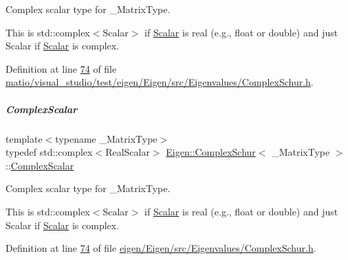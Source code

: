 Complex scalar type for {\ttfamily \+\_\+\+Matrix\+Type}. 

This is {\ttfamily std\+::complex$<$\+Scalar$>$} if \hyperlink{group___eigenvalues___module_a9a8ee9df37ee1f90d0e53103c58683c0}{Scalar} is real (e.\+g., {\ttfamily float} or {\ttfamily double}) and just {\ttfamily Scalar} if \hyperlink{group___eigenvalues___module_a9a8ee9df37ee1f90d0e53103c58683c0}{Scalar} is complex. 

Definition at line \hyperlink{matio_2visual__studio_2test_2eigen_2_eigen_2src_2_eigenvalues_2_complex_schur_8h_source_l00074}{74} of file \hyperlink{matio_2visual__studio_2test_2eigen_2_eigen_2src_2_eigenvalues_2_complex_schur_8h_source}{matio/visual\+\_\+studio/test/eigen/\+Eigen/src/\+Eigenvalues/\+Complex\+Schur.\+h}.

\mbox{\label{group___eigenvalues___module_ae1a4713b53f821867fbad617e426832a}} 
\subparagraph{\texorpdfstring{Complex\+Scalar}{ComplexScalar}\hspace{0.1cm}{\footnotesize\ttfamily [2/2]}}
{\footnotesize\ttfamily template$<$typename \+\_\+\+Matrix\+Type$>$ \\
typedef std\+::complex$<$Real\+Scalar$>$ \hyperlink{group___eigenvalues___module_class_eigen_1_1_complex_schur}{Eigen\+::\+Complex\+Schur}$<$ \+\_\+\+Matrix\+Type $>$\+::\hyperlink{group___eigenvalues___module_ae1a4713b53f821867fbad617e426832a}{Complex\+Scalar}}



Complex scalar type for {\ttfamily \+\_\+\+Matrix\+Type}. 

This is {\ttfamily std\+::complex$<$\+Scalar$>$} if \hyperlink{group___eigenvalues___module_a9a8ee9df37ee1f90d0e53103c58683c0}{Scalar} is real (e.\+g., {\ttfamily float} or {\ttfamily double}) and just {\ttfamily Scalar} if \hyperlink{group___eigenvalues___module_a9a8ee9df37ee1f90d0e53103c58683c0}{Scalar} is complex. 

Definition at line \hyperlink{eigen_2_eigen_2src_2_eigenvalues_2_complex_schur_8h_source_l00074}{74} of file \hyperlink{eigen_2_eigen_2src_2_eigenvalues_2_complex_schur_8h_source}{eigen/\+Eigen/src/\+Eigenvalues/\+Complex\+Schur.\+h}.

